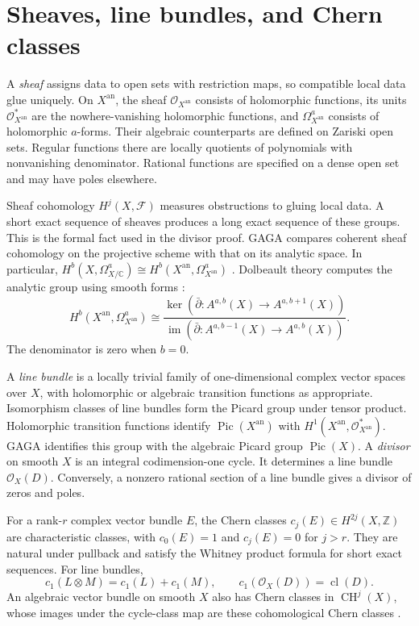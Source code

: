 \documentclass[11pt,reqno]{amsart}
\theoremstyle{definition}
\theoremstyle{remark}
\numberwithin{equation}{section}
\newcommand{\C}{\mathbb{C}}
\newcommand{\Z}{\mathbb{Z}}
\newcommand{\OO}{\mathcal{O}}
\newcommand{\an}{\mathrm{an}}
\newcommand{\dbar}{\bar\partial}
\DeclareMathOperator{\CH}{CH}
\DeclareMathOperator{\cl}{cl}
\DeclareMathOperator{\im}{im}
\DeclareMathOperator{\Pic}{Pic}
\begin{document}
\section{Sheaves, line bundles, and Chern classes}\label{sec:bundles}

A \emph{sheaf} assigns data to open sets with restriction maps, so
compatible local data glue uniquely. On $X^{\an}$, the sheaf $\OO_{X^{\an}}$
consists of holomorphic functions, its units $\OO_{X^{\an}}^*$ are the
nowhere-vanishing holomorphic functions, and $\Omega^a_{X^{\an}}$
consists of holomorphic $a$-forms. Their algebraic counterparts are
defined on Zariski open sets. Regular functions there are locally
quotients of polynomials with nonvanishing denominator. Rational
functions are specified on a dense open set and may have poles elsewhere.

Sheaf cohomology $H^j(X,\mathcal F)$ measures obstructions to gluing local
data. A short exact sequence of sheaves produces a long exact sequence
of these groups. This is the formal fact used in the divisor proof.
GAGA compares coherent sheaf cohomology on the projective scheme
with that on its analytic space. In particular,
$H^b(X,\Omega^a_{X/\C})\cong H^b(X^{\an},\Omega^a_{X^{\an}})$
\cite{serre1956gaga,gaganotes}. Dolbeault theory computes the analytic group
using smooth forms \cite{voisin2002hodge}:
\[
 H^b(X^{\an},\Omega^a_{X^{\an}})\cong
 \frac{\ker(\dbar:A^{a,b}(X)\to A^{a,b+1}(X))}
      {\im(\dbar:A^{a,b-1}(X)\to A^{a,b}(X))}.
\]
The denominator is zero when $b=0$.

A \emph{line bundle} is a locally trivial family of one-dimensional complex
vector spaces over $X$, with holomorphic or algebraic transition
functions as appropriate. Isomorphism classes of line bundles form the
Picard group under tensor product. Holomorphic transition functions identify
$\Pic(X^{\an})$ with $H^1(X^{\an},\OO_{X^{\an}}^*)$. GAGA identifies this
group with the algebraic Picard group $\Pic(X)$.
A \emph{divisor} on smooth $X$ is an integral codimension-one cycle.
It determines a line bundle $\OO_X(D)$. Conversely, a nonzero rational
section of a line bundle gives a divisor of zeros and poles.

For a rank-$r$ complex vector bundle $E$, the Chern classes
$c_j(E)\in H^{2j}(X,\Z)$ are characteristic classes, with
$c_0(E)=1$ and $c_j(E)=0$ for $j>r$. They are natural under pullback
and satisfy the Whitney product formula for short exact sequences.
For line bundles,
\[
 c_1(L\otimes M)=c_1(L)+c_1(M),\qquad
 c_1(\OO_X(D))=\cl(D).
\]
An algebraic vector bundle on smooth $X$ also has Chern classes in
$\CH^j(X)$, whose images under the cycle-class map are these cohomological
Chern classes \cite{fulton1998}.
\end{document}
